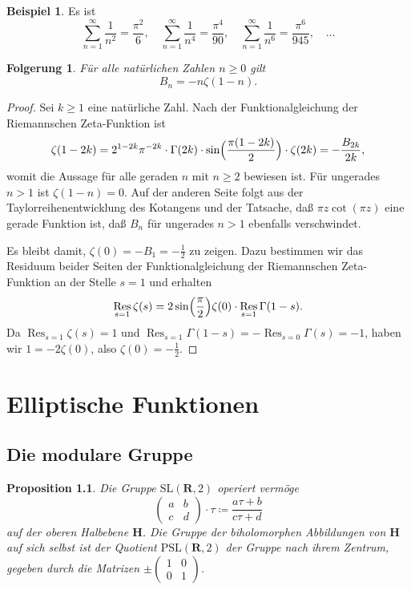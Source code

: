 \documentclass[a4paper,twoside,openright]{report}
\newtheorem{prop}[thm]{Proposition}
\newtheorem{cor}[thm]{Folgerung}
\theoremstyle{definition}
\newtheorem{xca}[thm]{Beispiel}
\theoremstyle{remark}
\DeclareMathOperator{\Res}{Res}
\begin{document}
\begin{xca}
  Es ist
  \[
    \sum_{n = 1}^\infty \frac 1 {n^2} = \frac{\pi^2} 6,\quad
    \sum_{n = 1}^\infty \frac 1 {n^4} = \frac{\pi^4} {90},\quad
    \sum_{n = 1}^\infty \frac 1 {n^6} = \frac{\pi^6} {945},\quad    
    \dots
  \]
\end{xca}

\begin{cor}
  Für alle natürlichen Zahlen $n \ge 0$ gilt
  \[
    B_n = - n \zeta(1 - n).
  \]
\end{cor}

\begin{proof}
  Sei $k \ge 1$ eine natürliche Zahl. Nach der Funktionalgleichung der
  Riemannschen Zeta-Funktion ist
  \[
    \zeta(1 - 2 k) = 2^{1 - 2k} \pi^{-2k} \cdot \Gamma(2k) \cdot \sin\Bigl(\frac{\pi (1 - 2k)} 2\Bigr) \cdot \zeta(2k)
    = - \frac{B_{2k}}{2k},
  \]
  womit die Aussage für alle geraden $n$ mit $n \ge 2$ bewiesen ist. Für ungerades
  $n > 1$ ist $\zeta(1 - n) = 0$. Auf der anderen Seite folgt aus der Taylorreihenentwicklung
  des Kotangens und der Tatsache, daß $\pi z \cot(\pi z)$ eine gerade Funktion ist,
  daß $B_n$ für ungerades $n > 1$ ebenfalls verschwindet.
  
  Es bleibt damit, $\zeta(0) = - B_1 = - \frac 1 2$ zu zeigen. Dazu bestimmen
  wir das Residuum beider Seiten der Funktionalgleichung der Riemannschen Zeta-Funktion
  an der Stelle $s = 1$ und erhalten
  \[
    \Res_{s = 1} \zeta(s) = 2 \sin\Bigl(\frac\pi 2\Bigr) \zeta(0) \cdot \Res_{s = 1} \Gamma(1 - s).
  \]
  Da $\Res_{s = 1} \zeta(s) = 1$ und $\Res_{s = 1} \Gamma(1 - s) = - \Res_{s = 0} \Gamma(s)
  = -1$, haben wir $1 = - 2 \zeta(0)$, also $\zeta(0) = -\frac 1 2$.
\end{proof}



\chapter{Elliptische Funktionen}

\section{Die modulare Gruppe}

\begin{prop}
  Die Gruppe $\mathrm{SL}(\mathbf R, 2)$ operiert vermöge
  \[
    \begin{pmatrix}
      a & b \\ c & d
    \end{pmatrix} \cdot \tau \coloneqq \frac{a \tau + b}{c \tau + d}
  \]
  auf der oberen Halbebene $\mathbf H$. Die Gruppe der biholomorphen Abbildungen von
  $\mathbf H$ auf sich selbst ist der Quotient $\mathrm{PSL}(\mathbf R, 2)$
  der Gruppe nach ihrem Zentrum, gegeben durch die Matrizen $\pm (\begin{smallmatrix} 1 & 0 \\ 0 & 1\end{smallmatrix})$.
\end{prop}
\end{document}
